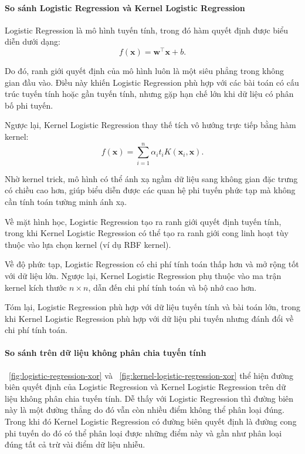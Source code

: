 \paragraph{So sánh Logistic Regression và Kernel Logistic Regression}
Logistic Regression là mô hình tuyến tính, trong đó hàm quyết định
được biểu diễn dưới dạng:
\begin{equation}
  f(\boldsymbol{x}) = \boldsymbol{w}^\intercal \boldsymbol{x} + b.
\end{equation}

Do đó, ranh giới quyết định của mô hình luôn là một siêu phẳng trong
không gian đầu vào. Điều này khiến Logistic Regression phù hợp với
các bài toán có cấu trúc tuyến tính hoặc gần tuyến tính, nhưng gặp
hạn chế lớn khi dữ liệu có phân bố phi tuyến.

Ngược lại, Kernel Logistic Regression thay thế tích vô hướng trực tiếp
bằng hàm kernel:
\begin{equation}
  f(\boldsymbol{x}) = \sum_{i=1}^{n} \alpha_i t_i K(\boldsymbol{x}_i,
  \boldsymbol{x}).
\end{equation}

Nhờ kernel trick, mô hình có thể ánh xạ ngầm dữ liệu sang không gian
đặc trưng có chiều cao hơn, giúp biểu diễn được các quan hệ phi tuyến
phức tạp mà không cần tính toán tường minh ánh xạ.

Về mặt hình học, Logistic Regression tạo ra ranh giới quyết định
tuyến tính, trong khi Kernel Logistic Regression có thể tạo ra ranh
giới cong linh hoạt tùy thuộc vào lựa chọn kernel (ví dụ RBF kernel).

Về độ phức tạp, Logistic Regression có chi phí tính toán thấp hơn và
mở rộng tốt với dữ liệu lớn. Ngược lại, Kernel Logistic Regression
phụ thuộc vào ma trận kernel kích thước $n \times n$, dẫn đến chi phí
tính toán và bộ nhớ cao hơn.

Tóm lại, Logistic Regression phù hợp với dữ liệu tuyến tính và bài
toán lớn, trong khi Kernel Logistic Regression phù hợp với dữ liệu
phi tuyến nhưng đánh đổi về chi phí tính toán.

\paragraph{So sánh trên dữ liệu không phân chia tuyến tính}
\figurename~\ref{fig:logistic-regression-xor} và
\figurename~\ref{fig:kernel-logistic-regression-xor} thể hiện đường biên quyết
định của Logistic Regression và Kernel Logistic Regression trên dữ liệu không
phân chia tuyến tính. Dễ thấy với Logistic Regression thì đường biên này là
một đường thẳng do đó vẫn còn nhiều điểm không thể phân loại đúng. Trong khi
đó Kernel Logistic Regression có đường biên quyết định là đường cong phi tuyến
do đó có thể phân loại được những điểm này và gần như phân loại đúng tất cả
trừ vài điểm dữ liệu nhiễu.

